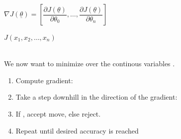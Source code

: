 \documentclass[
../../EiKI_Summary.tex,
]
{subfiles}
\begin{document}
\begin{defbox}
    \begin{minipage}
        [t]{0.5\textwidth}
        \begin{flushright}
             \hspace{10pt}

            \begin{smallmathbox*}
                $\nabla J(\underline{\theta}) = \left[\dfrac{\partial J(\underline{\theta})}{\partial \theta_0}, \dots, \dfrac{\partial J(\underline{\theta})}{\partial \theta_n}\right]$
            \end{smallmathbox*}
        \end{flushright}
    \end{minipage}
    \begin{minipage}
        [t]{0.5\textwidth}
        \begin{flushleft}
            \hspace{10pt}

            \begin{smallmathbox*}
                $J(x_1, x_2, \dots, x_n)$
            \end{smallmathbox*}
        \end{flushleft}
    \end{minipage}
    \\

    We now want to minimize over the continous variables .
    \begin{enumerate}
        \item Compute gradient: 
        \item Take a step downhill in the direction of the gradient: 
        \item If , accept move, else reject.
        \item Repeat until desired accuracy is reached
    \end{enumerate}
    

\end{defbox}
\end{document}
